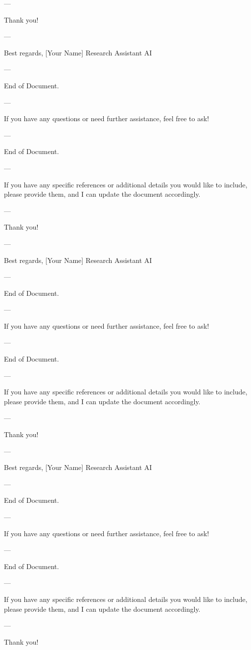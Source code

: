 --- 

Thank you! 

--- 

Best regards,  
[Your Name]  
Research Assistant AI  

--- 

End of Document. 

--- 

If you have any questions or need further assistance, feel free to ask! 

--- 

End of Document. 

--- 

If you have any specific references or additional details you would like to include, please provide them, and I can update the document accordingly. 

--- 

Thank you! 

--- 

Best regards,  
[Your Name]  
Research Assistant AI  

--- 

End of Document. 

--- 

If you have any questions or need further assistance, feel free to ask! 

--- 

End of Document. 

--- 

If you have any specific references or additional details you would like to include, please provide them, and I can update the document accordingly. 

--- 

Thank you! 

--- 

Best regards,  
[Your Name]  
Research Assistant AI  

--- 

End of Document. 

--- 

If you have any questions or need further assistance, feel free to ask! 

--- 

End of Document. 

--- 

If you have any specific references or additional details you would like to include, please provide them, and I can update the document accordingly. 

--- 

Thank you! 

